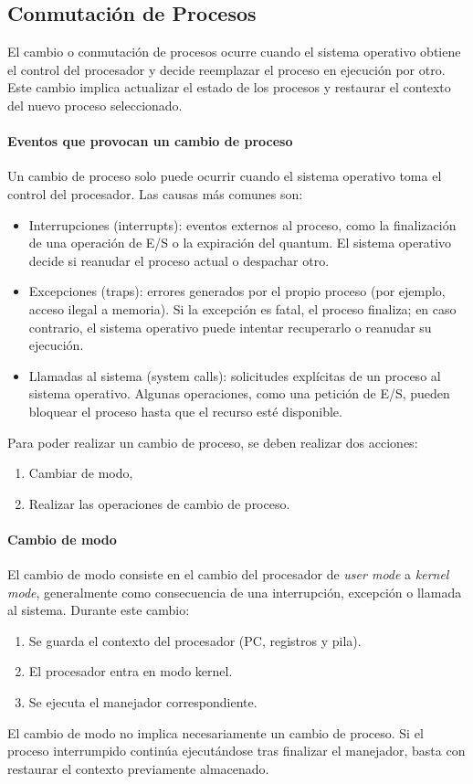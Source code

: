 \subsection{Conmutación de Procesos}

El cambio o conmutación de procesos ocurre cuando el sistema operativo obtiene el control del procesador y decide reemplazar el proceso en ejecución por otro. Este cambio implica actualizar el estado de los procesos y restaurar el contexto del nuevo proceso seleccionado.

\paragraph{Eventos que provocan un cambio de proceso}
Un cambio de proceso solo puede ocurrir cuando el sistema operativo toma el control del procesador. Las causas más comunes son:
\begin{itemize}
  \item Interrupciones (interrupts): eventos externos al proceso, como la finalización de una operación de E/S o la expiración del quantum. El sistema operativo decide si reanudar el proceso actual o despachar otro.
  \item Excepciones (traps): errores generados por el propio proceso (por ejemplo, acceso ilegal a memoria). Si la excepción es fatal, el proceso finaliza; en caso contrario, el sistema operativo puede intentar recuperarlo o reanudar su ejecución.
  \item Llamadas al sistema (system calls): solicitudes explícitas de un proceso al sistema operativo. Algunas operaciones, como una petición de E/S, pueden bloquear el proceso hasta que el recurso esté disponible.
\end{itemize}

Para poder realizar un cambio de proceso, se deben realizar dos acciones:
\begin{enumerate}
  \item Cambiar de modo,
  \item Realizar las operaciones de cambio de proceso.
\end{enumerate}

\paragraph{Cambio de modo}
El cambio de modo consiste en el cambio del procesador de \textit{user mode} a \textit{kernel mode}, generalmente como consecuencia de una interrupción, excepción o llamada al sistema. Durante este cambio:
\begin{enumerate}
  \item Se guarda el contexto del procesador (PC, registros y pila).
  \item El procesador entra en modo kernel.
  \item Se ejecuta el manejador correspondiente.
\end{enumerate}
El cambio de modo no implica necesariamente un cambio de proceso. Si el proceso interrumpido continúa ejecutándose tras finalizar el manejador, basta con restaurar el contexto previamente almacenado.

